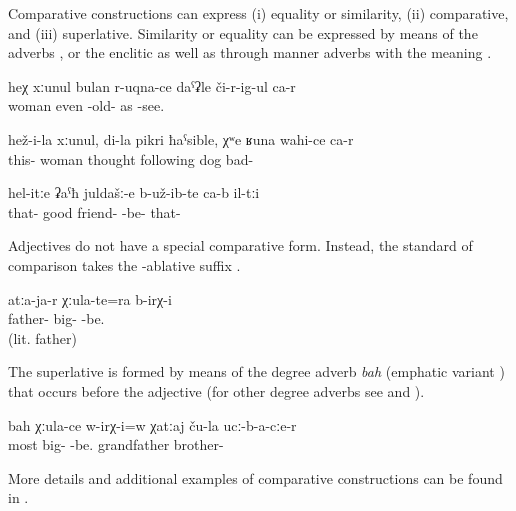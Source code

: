 Comparative constructions can express (i) equality or similarity, (ii) comparative, and (iii) superlative. Similarity or equality can be expressed by means of the adverbs   ,   or the enclitic   as well as through manner adverbs with the meaning  .
%
\begin{exe}
	\ex	\label{ex:There is even a woman who looks old}
	\gll	heχ	xːunul	bulan	r-uqna-ce	daˁʡle	či-r-ig-ul ca-r \\
			woman	even	-old-	as	-see.  \\
	\glt	{}

	\ex	\label{ex:His wife, in my mind, is bad like a dog}
	\gll	hež-i-la	xːunul,	di-la	pikri	ħaˁsible, χʷe	ʁuna	wahi-ce	ca-r \\
		this-	woman		thought	following	dog		bad-	 \\
	\glt	{}

	\ex	\label{ex:They were such good friends}
	\gll	hel-itːe	ʡaˁħ	juldašː-e	b-už-ib-te ca-b	il-tːi \\
		that-	good	friend-	-be- 	that- \\
	\glt	{}
\end{exe}

Adjectives do not have a special comparative form. Instead, the standard of comparison takes the -ablative suffix . 
%
\begin{exe}
	\ex	\label{ex:There were (brothers) older than grandfather}
	\gll	atːa-ja-r	χːula-te=ra	b-irχ-i \\
		father- 	big-	-be. \\
	\glt	{} (lit. father)
\end{exe}

The superlative is formed by means of the degree adverb \textit{bah}  (emphatic variant ) that occurs before the adjective  (for other degree adverbs see  and ).
%
\begin{exe}
	\ex	\label{ex:Was (our) grandfather the oldest among his brothers}
	\gll	bah	χːula-ce	w-irχ-i=w	χatːaj	ču-la	ucː-b-a-cːe-r \\
		most	big-	-be.	grandfather		brother- \\
	\glt	{}
\end{exe}

More details and additional examples of comparative constructions can be found in .




